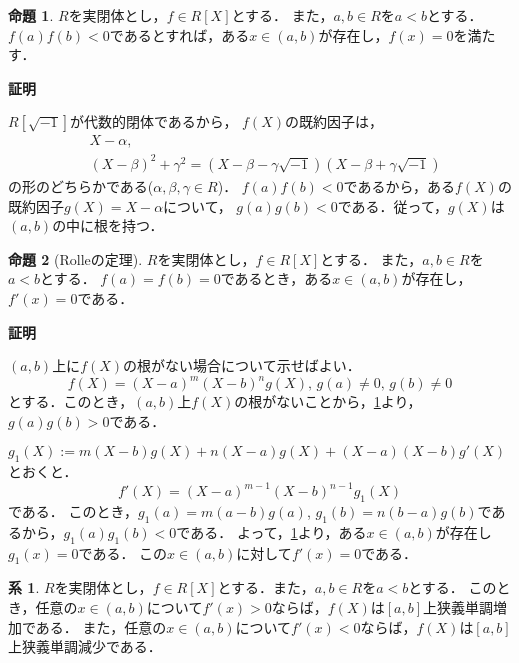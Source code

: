 \documentclass[uplatex, dvipdfmx]{jsarticle}
\makeatletter
\renewenvironment{proof}[1][\proofname]{\par
  \pushQED{\qed}%
  \normalfont \topsep6\p@\@plus6\p@\relax
  \trivlist
  \item\relax
  {\bfseries
  #1\@addpunct{.}}\hspace\labelsep\ignorespaces
}{%
  \popQED\endtrivlist\@endpefalse
}
\theoremstyle{definition}
\newtheorem{proposition}{命題}[section]
\newtheorem{corollary}{系}[section]
\renewcommand{\proofname}{\textbf{証明}}
\makeatother
\begin{document}
\begin{proposition}\label{proposition:intermediate}
     $R$を実閉体とし，$f \in R[X]$とする．
     また，$a,b \in R$を$a<b$とする．
     $f(a)f(b)<0$であるとすれば，ある$x \in (a,b)$が存在し，$f(x)=0$を満たす．
\end{proposition}
\begin{proof}
     $R[\sqrt{-1}]$が代数的閉体であるから，
     $f(X)$の既約因子は，
     \begin{align*}
          &X-\alpha, \\
          &(X-\beta)^2 + \gamma^2 = (X-\beta-\gamma\sqrt{-1})(X-\beta+\gamma\sqrt{-1})
     \end{align*}
     の形のどちらかである($\alpha, \beta, \gamma \in R$)．
     $f(a)f(b)<0$であるから，ある$f(X)$の既約因子$g(X) = X - \alpha$について，
     $g(a)g(b)<0$である．従って，$g(X)$は$(a,b)$の中に根を持つ．
\end{proof}

\begin{proposition}[Rolleの定理]\label{proposition:Rolle}
     $R$を実閉体とし，$f \in R[X]$とする．
     また，$a, b \in R$を$a<b$とする．
     $f(a)=f(b)=0$であるとき，ある$x \in (a,b)$が存在し，$f'(x)=0$である．
\end{proposition}
\begin{proof}
     $(a,b)$上に$f(X)$の根がない場合について示せばよい．
     \[
     f(X) = (X-a)^m(X-b)^ng(X), \, g(a)\neq0,\, g(b)\neq0
     \]
     とする．このとき，$(a,b)$上$f(X)$の根がないことから，\cref{proposition:intermediate}より，$g(a)g(b)>0$である．
     
     $g_1(X) := m(X-b)g(X)+n(X-a)g(X)+(X-a)(X-b)g'(X)$とおくと．
     \[
          f'(X) = (X-a)^{m-1}(X-b)^{n-1}g_1(X)
     \]
     である．
     このとき，$g_1(a) = m(a-b)g(a)$, $g_1(b)=n(b-a)g(b)$であるから，$g_1(a)g_1(b)<0$である．
     よって，\cref{proposition:intermediate}より，ある$x \in (a, b)$が存在し$g_1(x)=0$である．
     この$x \in (a,b)$に対して$f'(x)=0$である．
\end{proof}

\begin{corollary}
     $R$を実閉体とし，$f \in R[X]$とする．また，$a, b \in R$を$a<b$とする．
     このとき，任意の$x \in (a,b)$について$f'(x)>0$ならば，$f(X)$は$[a,b]$上狭義単調増加である．
     また，任意の$x \in (a,b)$について$f'(x)<0$ならば，$f(X)$は$[a,b]$上狭義単調減少である．
\end{corollary}

\end{document}
